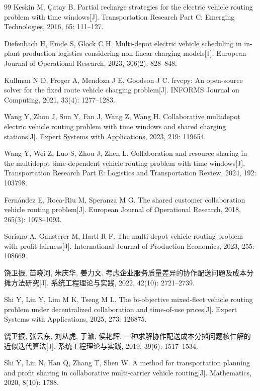 \documentclass{setp-new}
\begin{document}
\begin{thebibliography}{99}
 Keskin M, \c{C}atay B. Partial recharge strategies for the electric vehicle routing problem with time windows[J]. Transportation Research Part C: Emerging Technologies, 2016, 65: 111--127.

 Diefenbach H, Emde S, Glock C H. Multi-depot electric vehicle scheduling in in-plant production logistics considering non-linear charging models[J]. European Journal of Operational Research, 2023, 306(2): 828--848.

 Kullman N D, Froger A, Mendoza J E, Goodson J C. frvcpy: An open-source solver for the fixed route vehicle charging problem[J]. INFORMS Journal on Computing, 2021, 33(4): 1277--1283.

 Wang Y, Zhou J, Sun Y, Fan J, Wang Z, Wang H. Collaborative multidepot electric vehicle routing problem with time windows and shared charging stations[J]. Expert Systems with Applications, 2023, 219: 119654.

 Wang Y, Wei Z, Luo S, Zhou J, Zhen L. Collaboration and resource sharing in the multidepot time-dependent vehicle routing problem with time windows[J]. Transportation Research Part E: Logistics and Transportation Review, 2024, 192: 103798.

 Fern\'{a}ndez E, Roca-Riu M, Speranza M G. The shared customer collaboration vehicle routing problem[J]. European Journal of Operational Research, 2018, 265(3): 1078--1093.

 Soriano A, Gansterer M, Hartl R F. The multi-depot vehicle routing problem with profit fairness[J]. International Journal of Production Economics, 2023, 255: 108669.

 饶卫振, 苗晓河, 朱庆华, 姜力文. 考虑企业服务质量差异的协作配送问题及成本分摊方法研究[J]. 系统工程理论与实践, 2022, 42(10): 2721--2739.

 Shi Y, Lin Y, Lim M K, Tseng M L. The bi-objective mixed-fleet vehicle routing problem under decentralized collaboration and time-of-use prices[J]. Expert Systems with Applications, 2025, 273: 126875.

 饶卫振, 张云东, 刘从虎, 于灏, 侯艳辉. 一种求解协作配送成本分摊问题核仁解的近似迭代算法[J]. 系统工程理论与实践, 2019, 39(6): 1517--1534.

 Shi Y, Lin N, Han Q, Zhang T, Shen W. A method for transportation planning and profit sharing in collaborative multi-carrier vehicle routing[J]. Mathematics, 2020, 8(10): 1788.


\end{thebibliography}
\end{document}
